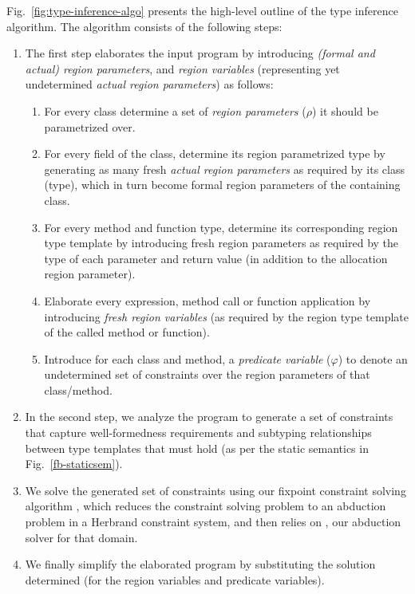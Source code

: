 Fig.~\ref{fig:type-inference-algo} presents the high-level outline of the type
inference algorithm.
The algorithm consists of the following steps:
\begin{enumerate}
 \item The first step elaborates the input program by introducing \emph{(formal and actual) region parameters},
and \emph{region variables} (representing yet undetermined \emph{actual region parameters})
as follows:
\begin{enumerate}
\item For every class determine a set of \emph{region parameters} ($\rho$)
       it should be parametrized over.
\item For every field of the class, determine its region parametrized type by
       generating as many fresh \emph{actual region parameters} as required by its class (type),
       which in turn become formal region parameters of the containing class.
\item  For every method and function type, determine its corresponding region
   type template by introducing fresh region parameters as required by
   the type of each parameter and return value (in addition to the allocation region
   parameter).
 \item Elaborate every  expression, method call or function application by
   introducing \emph{fresh region variables} (as required by the region type
   template of the called method or function).
\item Introduce for each class and method, a \emph{predicate variable} ($\varphi$) to denote
   an undetermined set of constraints over the region parameters of that
   class/method.
\end{enumerate}
 \item In the second step, we analyze the program to generate a set of constraints that capture
   well-formedness requirements and subtyping relationships between type templates
   that must hold (as per the static semantics in Fig.~\ref{fb-staticsem}).
 \item We solve the generated set of constraints using our fixpoint constraint
   solving algorithm \csolvestar, which reduces the constraint solving problem to
   an abduction problem in a Herbrand constraint system, and then relies on \csolve,
   our abduction solver for that domain. 
 \item We finally simplify the elaborated program by substituting the solution determined
   (for the region variables and predicate variables).
\end{enumerate}

